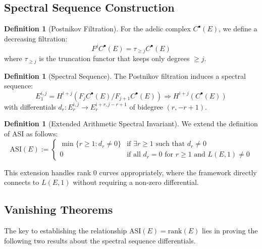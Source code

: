 \documentclass{article}
\theoremstyle{plain}
\theoremstyle{definition}
\newtheorem{definition}[theorem]{Definition}
\theoremstyle{remark}
\begin{document}
\subsection{Spectral Sequence Construction}

\begin{definition}[Postnikov Filtration]
For the adelic complex $C^\bullet(E)$, we define a decreasing filtration:
\[
F^j C^\bullet(E) = \tau_{\geq j}C^\bullet(E)
\]
where $\tau_{\geq j}$ is the truncation functor that keeps only degrees $\geq j$.
\end{definition}

\begin{definition}[Spectral Sequence]
The Postnikov filtration induces a spectral sequence:
\[
E_1^{i,j} = H^{i+j}(F_j C^\bullet(E)/F_{j+1}C^\bullet(E)) \Rightarrow H^{i+j}(C^\bullet(E))
\]
with differentials $d_r : E_r^{i,j} \to E_r^{i+r,j-r+1}$ of bidegree $(r, -r + 1)$.
\end{definition}

\begin{definition}[Extended Arithmetic Spectral Invariant]
We extend the definition of ASI as follows:
\[
\text{ASI}(E) := 
\begin{cases}
\min\{r \geq 1 : d_r \neq 0\} & \text{if $\exists r \geq 1$ such that $d_r \neq 0$} \\
0 & \text{if all $d_r = 0$ for $r \geq 1$ and $L(E,1) \neq 0$}
\end{cases}
\]

This extension handles rank 0 curves appropriately, where the framework directly connects to $L(E,1)$ without requiring a non-zero differential.
\end{definition}

\subsection{Vanishing Theorems}

The key to establishing the relationship $\text{ASI}(E) = \text{rank}(E)$ lies in proving the following two results about the spectral sequence differentials.
\end{document}
